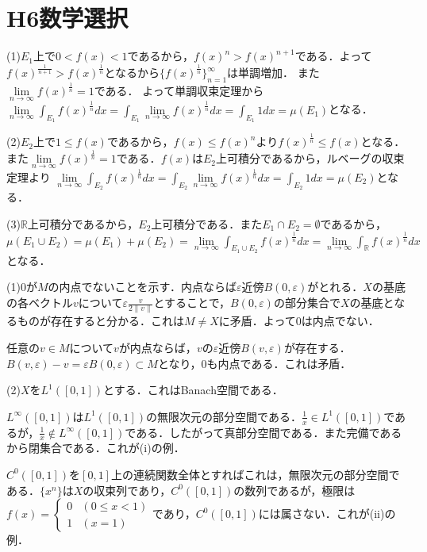 \documentclass[
		book,
		head_space=20mm,
		foot_space=20mm,
		gutter=10mm,
		line_length=190mm
]{jlreq}
\begin{document}
\section{H6数学選択}
(1)$E_1$上で$0<f(x)<1$であるから，$f(x)^n > f(x)^{n+1}$である．よって$f(x)^{\frac{1}{n+1}}>f(x)^{\frac{1}{n}}$となるから$\{ f(x)^\frac{1}{n}\}_{n=1}^\infty$は単調増加．
また$\lim\limits_{n \to \infty} f(x)^\frac{1}{n}=1$である．
よって単調収束定理から$\lim\limits_{n \to \infty} \int_{E_1} f(x)^\frac{1}{n}dx=\int_{E_1} \lim\limits_{n \to \infty} f(x)^\frac{1}{n}dx=\int_{E_1} 1dx=\mu(E_1)$となる．

(2)$E_2$上で$1\le f(x)$であるから，$f(x)\le f(x)^n $より$f(x)^\frac{1}{n}\le f(x)$となる．また$\lim\limits_{n \to \infty} f(x)^\frac{1}{n}=1$である．$f(x)$は$E_2$上可積分であるから，ルベーグの収束定理より
$\lim\limits_{n \to \infty} \int_{E_2} f(x)^\frac{1}{n}dx=\int_{E_2} \lim\limits_{n \to \infty} f(x)^\frac{1}{n}dx=\int_{E_2} 1dx=\mu(E_2)$となる．

(3)$\mathbb{R}$上可積分であるから，$E_2$上可積分である．また$E_1 \cap E_2=\emptyset$であるから，$\mu(E_1 \cup E_2)=\mu(E_1)+\mu(E_2)=\lim\limits_{n \to \infty} \int_{E_1 \cup E_2} f(x)^\frac{1}{n}dx=\lim\limits_{n \to \infty} \int_{\mathbb{R}} f(x)^\frac{1}{n}dx$となる．

(1)$0$が$M$の内点でないことを示す．内点ならば$\varepsilon$近傍$B(0,\varepsilon)$がとれる．$X$の基底の各ベクトル$v$について$\varepsilon\frac{v}{2\|v\|}$とすることで，$B(0,\varepsilon)$の部分集合で$X$の基底となるものが存在すると分かる．これは$M\neq X$に矛盾．よって$0$は内点でない．

任意の$v \in M$について$v$が内点ならば，$v$の$\varepsilon$近傍$B(v,\varepsilon)$が存在する．$B(v,\varepsilon)-v=\varepsilon B(0,\varepsilon)\subset M$となり，$0$も内点である．これは矛盾．

(2)$X$を$L^1([0,1])$とする．これはBanach空間である．

$L^{\infty}([0,1])$は$L^1([0,1])$の無限次元の部分空間である．$\frac{1}{x} \in L^1([0,1])$であるが，$\frac{1}{x} \notin L^{\infty}([0,1])$である．したがって真部分空間である．また完備であるから閉集合である．これが(i)の例．

$C^0([0,1])$を$[0,1]$上の連続関数全体とすればこれは，無限次元の部分空間である．$\{x^n\}$は$X$の収束列であり，$C^0([0,1])$の数列であるが，極限は$f(x)=\begin{cases} 0 & (0\le x < 1) \\ 1 & (x=1) \end{cases}$であり，$C^0([0,1])$には属さない．これが(ii)の例．
\end{document}
